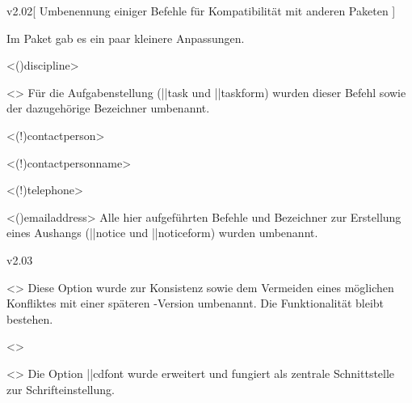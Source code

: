 \begin{Entity}{}
\begin{Changes}{v2.02}[%
  Umbenennung einiger Befehle für Kompatibilität mit anderen Paketen%
]
%
\begin{Entity}{}
Im Paket  gab es ein paar kleinere Anpassungen.
\begin{Obsolete}
  {}
  <\Macro(){discipline}>
\begin{Obsolete}
  {}
  <>
\printdeclarationlist
%
Für die Aufgabenstellung (\Environment||{task} und \Macro||{taskform}) wurden 
dieser Befehl sowie der dazugehörige Bezeichner umbenannt.
\end{Obsolete}
\end{Obsolete}

\begin{Obsolete}
  {}
  <\Macro(!){contactperson}>
\begin{Obsolete}
  {}
  <\Term(!){contactpersonname}>
\begin{Obsolete}
  {}
  <\Macro(!){telephone}>
\begin{Obsolete}
  {}
  <\Macro(){emailaddress}>
\printdeclarationlist
%
Alle hier aufgeführten Befehle und Bezeichner zur Erstellung eines Aushangs 
(\Environment||{notice} und \Macro||{noticeform}) wurden umbenannt.
\end{Obsolete}
\end{Obsolete}
\end{Obsolete}
\end{Obsolete}
\end{Entity}
\end{Changes}



\begin{Changes}{v2.03}
\begin{Obsolete}
  {}
  <>
\printdeclarationlist
%
Diese Option wurde zur Konsistenz sowie dem Vermeiden eines möglichen 
Konfliktes mit einer späteren \KOMAScript-Version umbenannt. Die Funktionalität 
bleibt bestehen.
\end{Obsolete}

\begin{Obsolete}
  {}
  <>
\begin{Obsolete}
  {}
  <>
\printdeclarationlist
%
Die Option \Option||{cdfont} wurde erweitert und fungiert als zentrale 
Schnittstelle zur Schrifteinstellung. 
\end{Obsolete}
\end{Obsolete}


\end{Changes}
\end{Entity}
